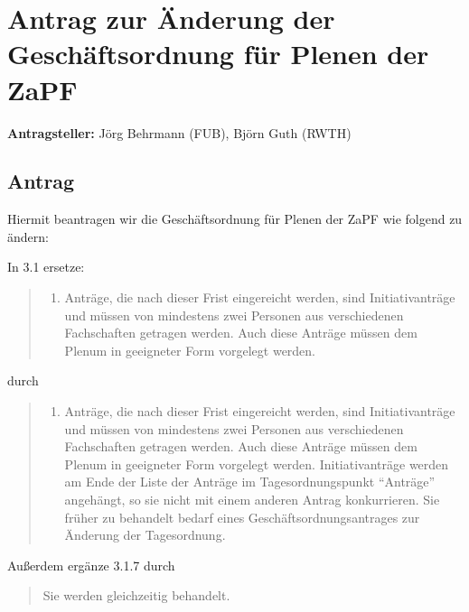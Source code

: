 \documentclass[draft,10pt,oneside]{scrartcl}
\begin{document}
\section*{Antrag zur Änderung der Geschäftsordnung für Plenen der ZaPF}

\textbf{Antragsteller:} Jörg Behrmann (FUB), Björn Guth (RWTH)

\subsection*{Antrag}

Hiermit beantragen wir die Geschäftsordnung für Plenen der ZaPF wie folgend zu
ändern:

In 3.1 ersetze:
\begin{quote}
    \setcounter{enumi}{3}
    \begin{enumerate}
        \item Anträge, die nach dieser Frist eingereicht werden, sind
            Initiativanträge und müssen von mindestens zwei Personen aus
            verschiedenen Fachschaften getragen werden. Auch diese Anträge
            müssen dem Plenum in geeigneter Form vorgelegt werden.
    \end{enumerate}
\end{quote}
durch
\begin{quote}
    \setcounter{enumi}{3}
    \begin{enumerate}
        \item Anträge, die nach dieser Frist eingereicht werden, sind
            Initiativanträge und müssen von mindestens zwei Personen aus
            verschiedenen Fachschaften getragen werden.  Auch diese Anträge
            müssen dem Plenum in geeigneter Form vorgelegt werden.
            Initiativanträge werden am Ende der Liste der Anträge im
            Tagesordnungspunkt ``Anträge'' angehängt, so sie nicht mit einem
            anderen Antrag konkurrieren.  Sie früher zu behandelt bedarf eines
            Geschäftsordnungsantrages zur Änderung der Tagesordnung.
    \end{enumerate}
\end{quote}
Außerdem ergänze 3.1.7 durch
\begin{quote}
    Sie werden gleichzeitig behandelt.
\end{quote}
\end{document}
